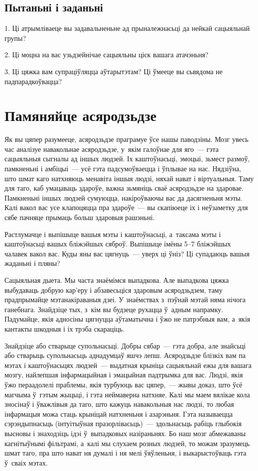 \subsection*{Пытаньні і заданьні}

1. Ці атрымліваеце вы задавальненьне ад прыналежнасьці да нейкай сацыяльнай групы?

2. Ці моцна на вас узьдзейнічае сацыяльны ціск вашага атачэньня?

3. Ці цяжка вам супраціўляцца аўтарытэтам? Ці ўмееце вы сьвядома не падпарадкоўвацца?


\section{Памяняйце асяродзьдзе}

Як вы цяпер разумееце, асяродзьдзе праграмуе ўсе нашы паводзіны. Мозг увесь час аналізуе навакольнае асяродзьдзе, у~якім галоўнае для яго~--- гэта сацыяльныя сыгналы ад іншых людзей. Іх каштоўнасьці, эмоцыі, зьмест размоў, памкненьні і амбіцыі~--- усё гэта падсумоўваецца і ўплывае на нас. Нядзіўна, што шмат каго натхняюць менавіта іншыя людзі, няхай нават і віртуальныя. Таму для таго, каб умацаваць здароўе, важна зьмяніць сваё асяродзьдзе на здаровае. Памкненьні іншых людзей сумуюцца, накіроўваючы вас да дасягненьня мэты. Калі вакол вас усе клапоцяцца пра здароўе~--- вы скапіюеце іх і неўзаметку для сябе пачняце прымаць больш здаровыя рашэньні.

Растлумачце і выпішыце вашыя мэты і каштоўнасьці, а~таксама мэты і каштоўнасьці вашых бліжэйшых сяброў. Выпішыце імёны 5--7 бліжэйшых чалавек вакол вас. Куды яны вас цягнуць~--- уверх ці ўніз? Ці супадаюць вашыя жаданьні і пляны?

Сацыяльная дыета. Мы часта знаёмімся выпадкова. Але выпадкова цяжка выбудаваць добрую кар'еру і абзавесьціся здаровым асяродзьдзем, таму прадпрымайце мэтанакіраваныя дзеі. У знаёмствах з~пэўнай мэтай няма нічога ганебнага. Знайдзіце тых, з~кім вы будзеце рухацца ў~адным напрамку. Падумайце, якія адносіны цягнуцца аўтаматычна і ўжо не патрэбныя вам, а~якія кантакты шкодныя і іх трэба скараціць.

Знайдзіце або стварыце супольнасьці. Добры сябар~--- гэта добра, але знайсьці або стварыць супольнасьць аднадумцаў яшчэ лепш. Асяродзьдзе блізкіх вам па мэтах і каштоўнасьцях людзей~--- выдатная крыніца сацыяльнай ежы для вашага мозгу, найлепшая інфармацыйная і эмацыйная падтрымка для вас. Людзі, якія ўжо пераадолелі праблемы, якія турбуюць вас цяпер,~--- жывы доказ, што ўсё магчыма ў~гэтым жыцьці, і гэта неймаверна натхняе. Калі мы маем вялікае кола зносінаў і ўважлівыя да таго, што кажуць навакольныя нас людзі, то любая інфармацыя можа стаць крыніцай натхненьня і азарэньня. Гэта называецца сэрэндыпнасьць (інтуітыўная празорлівасьць)~--- здольнасьць рабіць глыбокія высновы і знаходзіць ідэі ў~выпадковых назіраньнях. Бо наш мозг абмежаваны кагнітыўнымі фільтрамі, а~калі мы слухаем розных людзей, то можам зразумець шмат таго, пра што нават ня думалі і ня мелі ўяўленьня, і выкарыстоўваць гэта ў~сваіх мэтах.

